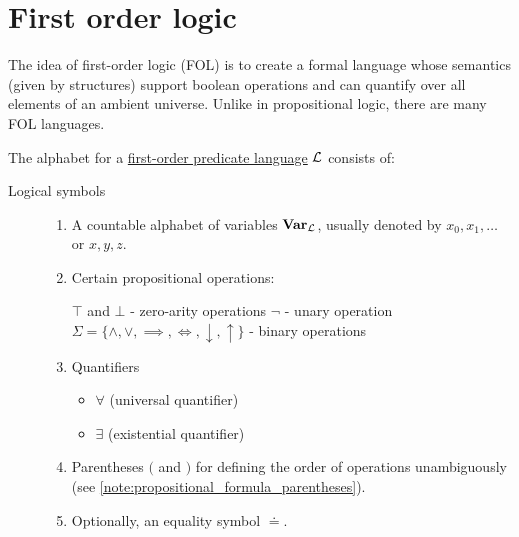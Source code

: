 \section{First order logic}\label{sec:first_order_logic}

The idea of first-order logic (FOL) is to create a formal language whose semantics (given by structures) support boolean operations and can quantify over all elements of an ambient universe. Unlike in propositional logic, there are many FOL languages.

\begin{definition}\label{def:first_order_language}\cite[definition 2.1]{Nerode2012}
  The alphabet for a \ul{first-order predicate language} $\mathcal L$ consists of:
  \begin{description}
    \item[Logical symbols]
    \mbox{}
    \begin{enumerate}
      \item A countable alphabet of variables $\operatorname{\mathbf{Var}}_{\mathcal L}$, usually denoted by $x_0, x_1, \ldots$ or $x, y, z$.

      \item Certain propositional operations:
      \begin{description}
         $\top$ and $\bot$ - zero-arity operations
         $\neg$ - unary operation
         $\Sigma = \{ \land, \lor, \implies, \iff, \downarrow, \uparrow \}$ - binary operations
      \end{description}

      \item Quantifiers
      \begin{itemize}
        \item $\forall$ (universal quantifier)
        \item $\exists$ (existential quantifier)
      \end{itemize}

      \item Parentheses $($ and $)$ for defining the order of operations unambiguously (see \cref{note:propositional_formula_parentheses}).

      \item Optionally, an equality symbol $\doteq$.
    \end{enumerate}


\end{description}
\end{definition}
